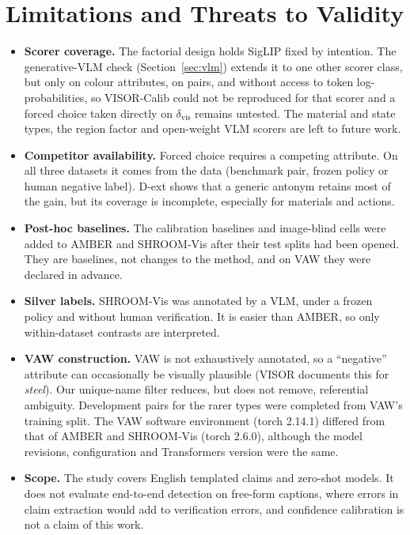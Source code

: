 \documentclass[11pt]{article}
\begin{document}
\section{Limitations and Threats to Validity}\label{sec:threats}
\begin{itemize}[leftmargin=*]
\item \textbf{Scorer coverage.} The factorial design holds SigLIP fixed by intention. The generative-VLM check (Section~\ref{sec:vlm}) extends it to one other scorer class, but only on colour attributes, on \VLMpairs{} pairs, and without access to token log-probabilities, so VISOR-Calib could not be reproduced for that scorer and a forced choice taken directly on $\delta_{\mathrm{vis}}$ remains untested. The material and state types, the region factor and open-weight VLM scorers are left to future work.
\item \textbf{Competitor availability.} Forced choice requires a competing attribute. On all three datasets it comes from the data (benchmark pair, frozen policy or human negative label). D-ext shows that a generic antonym retains most of the gain, but its coverage is incomplete, especially for materials and actions.
\item \textbf{Post-hoc baselines.} The calibration baselines and image-blind cells were added to AMBER and SHROOM-Vis after their test splits had been opened. They are baselines, not changes to the method, and on VAW they were declared in advance.
\item \textbf{Silver labels.} SHROOM-Vis was annotated by a VLM, under a frozen policy and without human verification. It is easier than AMBER, so only within-dataset contrasts are interpreted.
\item \textbf{VAW construction.} VAW is not exhaustively annotated, so a ``negative'' attribute can occasionally be visually plausible (VISOR documents this for \emph{steel}). Our unique-name filter reduces, but does not remove, referential ambiguity. Development pairs for the rarer types were completed from VAW's training split. The VAW software environment (torch 2.14.1) differed from that of AMBER and SHROOM-Vis (torch 2.6.0), although the model revisions, configuration and Transformers version were the same.
\item \textbf{Scope.} The study covers English templated claims and zero-shot models. It does not evaluate end-to-end detection on free-form captions, where errors in claim extraction would add to verification errors, and confidence calibration is not a claim of this work.
\end{itemize}
\end{document}
